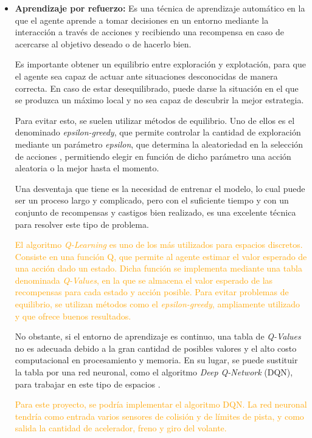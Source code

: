 \documentclass[a4paper,11pt]{book}
\begin{document}
\begin{itemize}
   \item \textbf{Aprendizaje por refuerzo:} Es una técnica de aprendizaje automático en la que el agente aprende a tomar decisiones en un entorno mediante la interacción a través de acciones %
   y recibiendo una recompensa en caso de acercarse al objetivo deseado o de hacerlo bien. 
   
   Es importante obtener un equilibrio entre exploración y explotación, para que el agente sea capaz de actuar ante situaciones desconocidas de manera correcta. En caso de estar desequilibrado, puede darse la situación en el que se produzca un máximo local y no sea capaz de descubrir la mejor estrategia.

   
   Para evitar esto, se suelen utilizar métodos de equilibrio. Uno de ellos es el denominado \textit{epsilon-greedy}, que permite controlar la cantidad de exploración mediante un parámetro \textit{epsilon}, que determina la aleatoriedad en la selección de acciones \cite{10.1007/978-3-642-24455-1_33}, permitiendo elegir en función de dicho parámetro una acción aleatoria o la mejor hasta el momento.

   Una desventaja que tiene es la necesidad de entrenar el modelo, lo cual puede ser un proceso largo y complicado, pero con el suficiente tiempo y con un conjunto de recompensas y castigos bien realizado, es una excelente técnica para resolver este tipo de problema.

   \textcolor{orange}{El algoritmo \textit{Q-Learning} es uno de los más utilizados para espacios discretos. Consiste en una función Q, que permite al agente estimar el valor esperado de una acción dado un estado. Dicha función se implementa mediante una tabla denominada \textit{Q-Values}, en la que se almacena el valor esperado de las recompensas para cada estado y acción posible. Para evitar problemas de equilibrio, se utilizan métodos como el \textit{epsilon-greedy}, ampliamente utilizado y que ofrece buenos resultados.}

   No obstante, si el entorno de aprendizaje es continuo, una tabla de \textit{Q-Values} no es adecuada debido a la gran cantidad de posibles valores y el alto costo computacional en procesamiento y memoria. En su lugar, se puede sustituir la tabla por una red neuronal, como el algoritmo \textit{Deep Q-Network} (DQN), para trabajar en este tipo de espacios \cite{coulom:tel-00003985}.

   \textcolor{orange}{Para este proyecto, se podría implementar el algoritmo DQN. La red neuronal tendría como entrada varios sensores de colisión y de límites de pista, y como salida la cantidad de acelerador, freno y giro del volante.}


\end{itemize}
\end{document}

